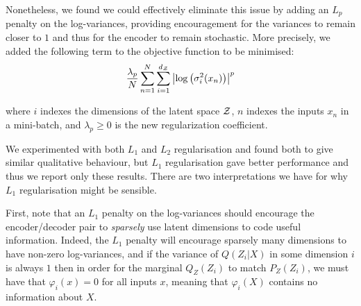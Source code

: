Nonetheless, we found we could effectively eliminate this issue by adding an $L_p$ penalty on the log-variances,   providing encouragement for the variances to remain closer to $1$ and thus for the encoder to remain stochastic. More precisely, we added the following term to the objective function to be minimised:
\begin{equation}
\frac{\lambda_{p}}{N}\sum_{n=1}^N \sum_{i=1}^{d_{\mathcal{Z}}} \left|\log\left(\sigma^2_{i}(x_n)\right) \right|^p
\end{equation}



where  $i$ indexes the dimensions of the latent space $\mathcal{Z}$, $n$ indexes the inputs $x_n$ in a mini-batch, and $\lambda_{p}\geq 0$ is the new regularization coefficient.

We experimented with both $L_1$ and $L_2$ regularisation and found both to give similar qualitative behaviour, but $L_1$ regularisation gave better performance and thus we report only these results. There are two interpretations we have for why $L_1$ regularisation might be sensible.

First, note that an $L_1$ penalty on the log-variances should encourage the encoder/decoder pair to \emph{sparsely} use latent dimensions to code useful information. Indeed, the $L_1$ penalty will encourage sparsely many dimensions to have non-zero log-variances, and if the variance of $Q(Z_i|X)$ in some dimension $i$ is always $1$ then in order for the marginal $Q_Z(Z_i)$ to match $P_Z(Z_i)$, we must have that $\varphi_i(x)=0$ for all inputs $x$, meaning that $\varphi_i(X)$ contains no information about $X$.

